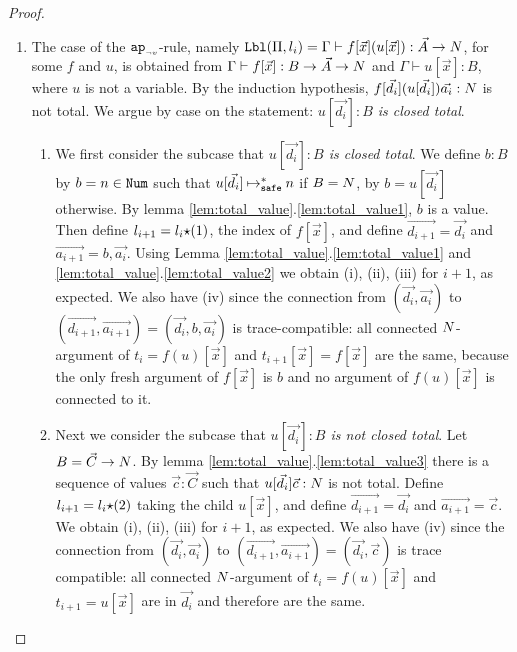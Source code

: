 \begin{proof}
\begin{enumerate}
\item
  The case of the ${{\tt ap}_{\mbox{\tiny $\neg v$}}}$-rule, namely 
  ${\tt Lbl}(\Pi,l_i) = \Gamma\vdash f[\vec{x}](u[\vec{x}]): \vec{A}\rightarrow{N}$, 
  for some $f$ and $u$, is obtained from $\Gamma\vdash f[\vec{x}]: B \rightarrow \vec{A}\rightarrow{N}$ 
  and $\Gamma\vdash u[\vec{x}]: B$, where $u$ is not a variable.
  By the induction hypothesis, $f[\vec{d_i}](u[\vec{d_i}])\vec{a_i}:{N}$ is not total.
  We argue by case on the statement: \emph{$u[\vec{d_i}]:B$ is closed total}.

\begin{enumerate}
\item
  We first consider the subcase that \emph{$u[\vec{d_i}]:B$ is closed total}.
  We define $b:B$ by $b = n\in{\tt Num}$ such that $u[\vec{d_i}] \mathbin{\mathbin{\mapsto}_{\hbox{\scriptsize \tt safe}}^*} n$ if $B={N}$,
  by $b = u[\vec{d_i}]$ otherwise. By lemma \ref{lem:total_value}.\ref{lem:total_value1}, $b$ is a value.
  Then define $l_{i+1}=l_i{\star}(1)$, the index of $f[\vec{x}]$,
  and define $\vec{d_{i+1}} = \vec{d_i}$ and $\vec{a_{i+1}} = b,\vec{a_i}$. 
  Using Lemma \ref{lem:total_value}.\ref{lem:total_value1} and \ref{lem:total_value}.\ref{lem:total_value2}
  we obtain (i), (ii), (iii) for $i+1$, as expected. 
  We also have (iv) since the connection from 
  $(\vec{d_i},\vec{a_i})$ to $(\vec{d_{i+1}},\vec{a_{i+1}}) = (\vec{d_i},b,\vec{a_i})$ is
  trace-compatible: all connected 
  ${N}$-argument of $t_{i}=f(u)[\vec{x}]$ and $t_{i+1}[\vec{x}] = f[\vec{x}]$ are the same,
  because the only fresh argument of $f[\vec{x}]$ 
  is $b$ and no argument of $f(u)[\vec{x}]$ is connected to it.
\item
  Next we consider the subcase that \emph{$u[\vec{d_i}]:B$ is not closed total}.
  Let $B = \vec{C}\rightarrow{N}$.
  By lemma \ref{lem:total_value}.\ref{lem:total_value3}
  there is a sequence of values $\vec{c}:\vec{C}$ such that $u[\vec{d_i}]\vec{c}:{N}$ is not total.
  Define $l_{i+1}= l_i {\star} (2)$ taking the child $u[\vec{x}]$,
  and define $\vec{d_{i+1}} = \vec{d_i}$ and $\vec{a_{i+1}} = \vec{c}$. 
  We obtain (i), (ii), (iii) for $i+1$, as expected.
  We also have (iv) since the connection from 
  $(\vec{d_i},\vec{a_i})$ to $(\vec{d_{i+1}},\vec{a_{i+1}}) = (\vec{d_i},\vec{c})$ is
  trace compatible: all connected ${N}$-argument of $t_{i}=f(u)[\vec{x}]$ and $t_{i+1}=u[\vec{x}]$ are 
  in $\vec{d_i}$ and therefore are the same.
 \end{enumerate}


\end{enumerate}
\end{proof}
